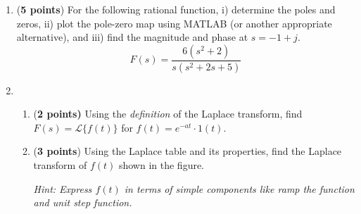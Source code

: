 \documentclass[]{article}
\begin{document}
\begin{enumerate}

    \item (\textbf{5 points}) For the following rational function, i) determine the poles and zeros, ii) plot the pole-zero map using MATLAB (or another appropriate alternative), and iii) find the magnitude and phase at $s=-1+j$.
    $$F(s)=\frac{6(s^2+2)}{s(s^2+2s+5)}$$
    \vspace{0.2 cm}

    \item
    \begin{enumerate}
        \item (\textbf{2 points)} Using the \textit{definition} of the Laplace transform, find $F(s)=\mathcal{L}\{f(t)\}$ for $f(t)=e^{-at}\cdot1(t)$.
        \item (\textbf{3 points}) Using the Laplace table and its properties, find the Laplace transform of $f(t)$ shown in the figure.
        \begin{center}
        \end{center}
        \textit{Hint: Express $f(t)$ in terms of simple components like ramp the function and unit step function.}
    \end{enumerate}
    \vspace{0.4 cm}


\end{enumerate}
\end{document}
